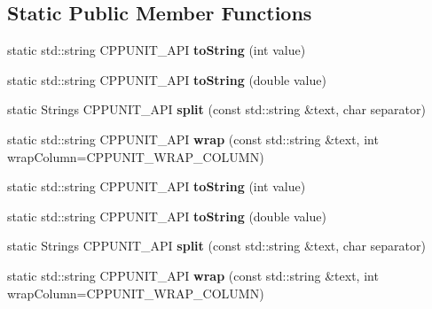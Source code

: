 \subsection*{Static Public Member Functions}
\begin{DoxyCompactItemize}
\item 
\hypertarget{struct_string_tools_a0f6f1f593dda440678e0a161617407ad}{static std\+::string C\+P\+P\+U\+N\+I\+T\+\_\+\+A\+P\+I {\bfseries to\+String} (int value)}\label{struct_string_tools_a0f6f1f593dda440678e0a161617407ad}

\item 
\hypertarget{struct_string_tools_a371b4e29c2d4817462ba89634c88b2ec}{static std\+::string C\+P\+P\+U\+N\+I\+T\+\_\+\+A\+P\+I {\bfseries to\+String} (double value)}\label{struct_string_tools_a371b4e29c2d4817462ba89634c88b2ec}

\item 
\hypertarget{struct_string_tools_a7a487bf859324dc4172e2dce6ed2b533}{static Strings C\+P\+P\+U\+N\+I\+T\+\_\+\+A\+P\+I {\bfseries split} (const std\+::string \&text, char separator)}\label{struct_string_tools_a7a487bf859324dc4172e2dce6ed2b533}

\item 
\hypertarget{struct_string_tools_a87224ef928017702852dc221673bc32e}{static std\+::string C\+P\+P\+U\+N\+I\+T\+\_\+\+A\+P\+I {\bfseries wrap} (const std\+::string \&text, int wrap\+Column=C\+P\+P\+U\+N\+I\+T\+\_\+\+W\+R\+A\+P\+\_\+\+C\+O\+L\+U\+M\+N)}\label{struct_string_tools_a87224ef928017702852dc221673bc32e}

\item 
\hypertarget{struct_string_tools_a2b4a4cbbfa69a2c28c71bd519ba71e5c}{static std\+::string C\+P\+P\+U\+N\+I\+T\+\_\+\+A\+P\+I {\bfseries to\+String} (int value)}\label{struct_string_tools_a2b4a4cbbfa69a2c28c71bd519ba71e5c}

\item 
\hypertarget{struct_string_tools_adfab22bf90b73231f635aa1ae299d4c4}{static std\+::string C\+P\+P\+U\+N\+I\+T\+\_\+\+A\+P\+I {\bfseries to\+String} (double value)}\label{struct_string_tools_adfab22bf90b73231f635aa1ae299d4c4}

\item 
\hypertarget{struct_string_tools_ac3c3d30a35c82c1d5fcb54e915130767}{static Strings C\+P\+P\+U\+N\+I\+T\+\_\+\+A\+P\+I {\bfseries split} (const std\+::string \&text, char separator)}\label{struct_string_tools_ac3c3d30a35c82c1d5fcb54e915130767}

\item 
\hypertarget{struct_string_tools_a02d43819e61394264c3e75c24433a057}{static std\+::string C\+P\+P\+U\+N\+I\+T\+\_\+\+A\+P\+I {\bfseries wrap} (const std\+::string \&text, int wrap\+Column=C\+P\+P\+U\+N\+I\+T\+\_\+\+W\+R\+A\+P\+\_\+\+C\+O\+L\+U\+M\+N)}\label{struct_string_tools_a02d43819e61394264c3e75c24433a057}

\end{DoxyCompactItemize}


